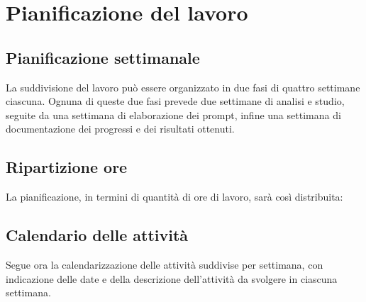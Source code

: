 
\section{Pianificazione del lavoro}

\subsection{Pianificazione settimanale}
La suddivisione del lavoro può essere organizzato in due fasi di quattro settimane ciascuna. Ognuna di queste due fasi prevede due settimane di analisi e studio, seguite da una settimana di elaborazione dei prompt, infine una settimana di documentazione dei progressi e dei risultati ottenuti.\\
\prospettoSettimanale

\newpage

\subsection{Ripartizione ore}

La pianificazione, in termini di quantità di ore di lavoro, sarà così distribuita:

\begin{center}
    
\end{center}
\vspace{1cm}
\subsection{Calendario delle attività}
Segue ora la calendarizzazione delle attività suddivise per settimana, con indicazione delle date e della descrizione dell'attività da svolgere in ciascuna settimana.

\begin{center}
    
\end{center}

\newpage